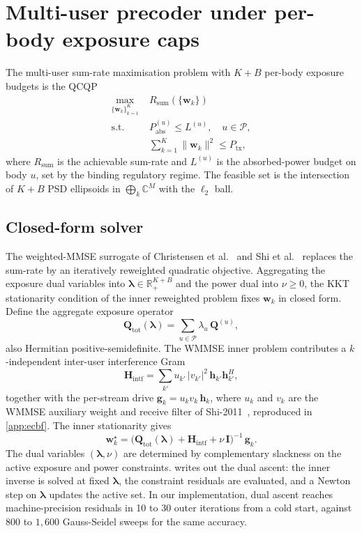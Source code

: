 \documentclass[journal,twocolumn,10pt]{IEEEtran}
\theoremstyle{plain}
\theoremstyle{remark}
\newcommand{\hh}{\mathbf{h}}
\newcommand{\ww}{\mathbf{w}}
\newcommand{\gvec}{\mathbf{g}}
\newcommand{\Pabs}{P_{\mathrm{abs}}}
\newcommand{\Qmat}{\mathbf{Q}}
\newcommand{\Hintf}{\mathbf{H}_{\mathrm{intf}}}
\newcommand{\Complex}{\mathbb{C}}
\newcommand{\AllBodies}{\mathcal{P}}
\begin{document}
\section{Multi-user precoder under per-body exposure caps}\label{sec:precoder}

The multi-user sum-rate maximisation problem with $K + B$ per-body
exposure budgets is the QCQP
\begin{equation}\label{eq:P-MB}
\begin{aligned}
  \max_{\{\ww_k\}_{k=1}^K} \;& R_{\mathrm{sum}}(\{\ww_k\}) \\
  \text{s.t.}\;& \Pabs^{(u)} \leq L^{(u)},\quad u \in \AllBodies,\\
  & \sum_{k=1}^K \|\ww_k\|^2 \leq P_{\mathrm{tx}},
\end{aligned}
\end{equation}
where $R_{\mathrm{sum}}$ is the achievable sum-rate and $L^{(u)}$ is
the absorbed-power budget on body $u$, set by the binding regulatory
regime. The feasible set is the intersection of $K + B$ PSD ellipsoids
in $\bigoplus_k \Complex^M$ with the $\ell_2$ ball.

\subsection{Closed-form solver}

The weighted-MMSE surrogate of Christensen et
al.~\cite{Christensen2008} and Shi et al.~\cite{Shi2011} replaces the
sum-rate by an iteratively reweighted quadratic objective. Aggregating
the exposure dual variables into $\bm\lambda \in \mathbb{R}_+^{K+B}$
and the power dual into $\nu \geq 0$, the KKT stationarity condition
of the inner reweighted problem fixes $\ww_k$ in closed form. Define
the aggregate exposure operator
\begin{equation}\label{eq:Qtot}
  \Qmat_{\mathrm{tot}}(\bm\lambda) =
  \sum_{u \in \AllBodies} \lambda_u\,\Qmat^{(u)},
\end{equation}
also Hermitian positive-semidefinite. The WMMSE inner problem
contributes a $k$-independent inter-user interference Gram
\begin{equation}\label{eq:Hgram}
  \Hintf =
  \sum_{k'} u_{k'}\,|v_{k'}|^2\,\hh_{k'}\hh_{k'}^H,
\end{equation}
together with the per-stream drive $\gvec_k = u_k v_k\,\hh_k$, where
$u_k$ and $v_k$ are the WMMSE auxiliary weight and receive filter of
Shi-2011~\cite{Shi2011}, reproduced in \cref{app:ecbf}. The inner
stationarity gives
\begin{equation}\label{eq:closedform}
  \boxed{\;
  \ww_k^\star =
  \bigl(\Qmat_{\mathrm{tot}}(\bm\lambda) + \Hintf + \nu\,\mathbf{I}\bigr)^{-1}\,
  \gvec_k.\;}
\end{equation}
The dual variables $(\bm\lambda, \nu)$ are determined by
complementary slackness on the active exposure and power constraints.
 writes out the dual ascent: the inner inverse is
solved at fixed $\bm\lambda$, the constraint residuals are evaluated,
and a Newton step on $\bm\lambda$ updates the active set. In our
implementation, dual ascent reaches machine-precision residuals in
10 to 30 outer iterations from a cold start, against 800 to
$1{,}600$ Gauss-Seidel sweeps for the same accuracy.
\end{document}
